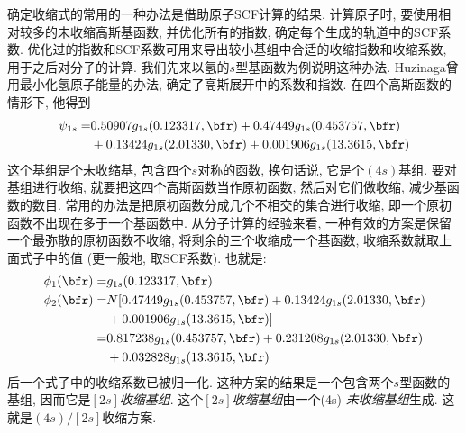 确定收缩式的常用的一种办法是借助原子SCF计算的结果. 
计算原子时, 
要使用相对较多的未收缩高斯基函数, 
并优化所有的指数, 
确定每个生成的轨道中的SCF系数. 
优化过的指数和SCF系数可用来导出较小基组中合适的收缩指数和收缩系数, 
用于之后对分子的计算. 
我们先来以氢的$s$型基函数为例说明这种办法. 
Huzinaga曾用最小化氢原子能量的办法, 
确定了高斯展开中的系数和指数. 
在四个高斯函数的情形下, 
他得到
\begin{align}
	\label{3.288}
	\psi_{1s} = &   0.50907g_{1s}(0.123317,\bfr) + 0.47449 g_{1s}(0.453757,\bfr) \notag\\
	& + 0.13424 g_{1s}(2.01330,\bfr) + 0.001906 g_{1s}(13.3615,\bfr)
\end{align}
这个基组是个未收缩基, 
包含四个$s$对称的函数, 
换句话说, 
它是个$(4s)$基组. 
要对基组进行收缩, 
就要把这四个高斯函数当作原初函数, 
然后对它们做收缩, 
减少基函数的数目. 
常用的办法是把原初函数分成几个不相交的集合进行收缩, 
即一个原初函数不出现在多于一个基函数中. 
从分子计算的经验来看, 
一种有效的方案是保留一个最弥散的原初函数不收缩, 
将剩余的三个收缩成一个基函数, 
收缩系数就取上面式子中的值 (更一般地, 
取SCF系数). 
也就是:
\begin{align}
	\label{3.289}
	\phi_1(\bfr) = & g_{1s}(0.123317,\bfr)                                               \\
	\phi_2(\bfr) = & N[0.47449g_{1s}(0.453757,\bfr)+ 0.13424 g_{1s}(2.01330,\bfr) \notag \\
	& + 0.001906 g_{1s}(13.3615,\bfr)]                                    \notag \\
	=              & 0.817238g_{1s}(0.453757,\bfr)+ 0.231208 g_{1s}(2.01330,\bfr)  \notag\\
	& +0.032828 g_{1s}(13.3615,\bfr)
\end{align}
后一个式子中的收缩系数已被归一化. 
这种方案的结果是一个包含两个$s$型函数的基组, 
因而它是\emph{$[2s]$收缩基组}. 这个\emph{$[2s]$收缩基组}由一个(4s) \emph{未收缩基组}生成.  
这就是$(4s)/[2s]$收缩方案.


